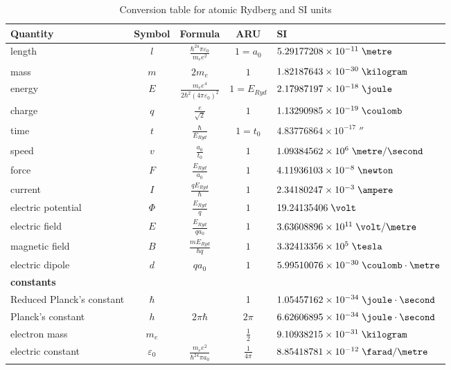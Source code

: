 \begin{table}
 \caption{Conversion table for atomic Rydberg and SI units}
 \label{tab:units}
 \begin{center}
  \begin{tabular*}{\textwidth}{p{}|c|c|c|l}
   Quantity&Symbol&Formula&ARU&SI \\
   \hline 
   \hline 
   length & $l$ & $\frac{\hbar^24\pi\varepsilon_0}{m_ee^2}$& $1=a_0$ & $5.29177208\times 10^{-11}\;\metre$ \\
   mass & $m$ & $2m_e$ & $1$ & $1.82187643\times10^{-30}\;\kilogram$ \\
   energy & $E$ & $\frac{m_ee^4}{2\hbar^2(4\pi\varepsilon_0)^2}$&$1=E_{Ryd}$ & $2.17987197\times10^{-18}\;\joule$\\ 
   charge& $q$& $\frac{e}{\sqrt{2}}$& $1$ & $1.13290985\times10^{-19}\;\coulomb$\\
   time & $t$& $\frac{\hbar}{E_{Ryd}}$ & $1=t_0$ & $4.83776864\times10^{-17}\;\second$\\ 
   speed & $v$ & $\frac{a_0}{t_0}$ & $1$ & $1.09384562\times10^{6}\;\metre/\second$ \\
   force &$F$& $\frac{E_{Ryd}}{a_0}$& $1$&$4.11936103\times10^{-8}\;\newton$\\
   current &$I$&$\frac{qE_{Ryd}}{\hbar}$ &$1$&$2.34180247\times10^{-3}\;\ampere$\\
   electric potential &$\Phi$&$\frac{E_{Ryd}}{q}$ &$1$ & $19.24135406\;\volt$\\ 
   electric field & $E$ &$\frac{E_{Ryd}}{qa_0}$ &$1$& $3.63608896\times10^{11}\;\volt/\metre$ \\
   magnetic field & $B$ &$\frac{mE_{Ryd}}{\hbar q}$ &$1$ & $3.32413356\times10^{5}\;\tesla$\\
   electric dipole & $d$ &$qa_0$ & $1$ & $5.99510076\times{10}^{-30}\;\coulomb\cdot\metre$\\
   \hline\hline	
   \multicolumn{5}{l}{\bfseries constants} \\
   Reduced Planck's constant &$\hbar$& & 1 & $1.05457162\times10^{-34}\; \joule\cdot\second$ \\
   Planck's constant &$h$&$2\pi\hbar$ & $2\pi$ & $6.62606895\times10^{-34}\; \joule\cdot\second$ \\
   electron mass  & $m_e$ & &$\frac{1}{2}$&$9.10938215\times10^{-31}\;\kilogram$ \\
   electric constant &$\varepsilon_0$& $\frac{m_ee^2}{\hbar^24\pi a_0}$&$\frac{1}{4\pi}$& $8.85418781\times10^{-12}\; \farad/\metre$ \\ 

\end{tabular*}
\end{center}
\end{table}
